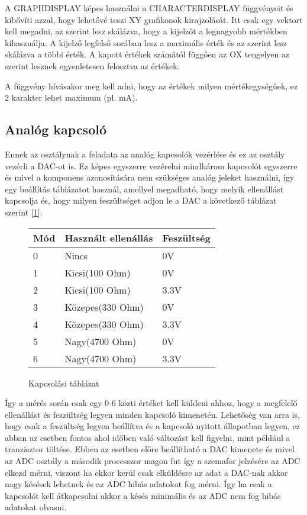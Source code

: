 A GRAPHDISPLAY képes használni a CHARACTERDISPLAY függvényeit és kibővíti azzal,
hogy lehetővé teszi XY grafikonok kirajzolását. Itt csak egy vektort kell megadni,
az szerint lesz skálázva, hogy a kijelzőt a legnagyobb mértékben kihasználja.
A kijelző legfelső sorában lesz a maximális érték és az szerint lesz skálázva a
többi érték. A kapott értékek számától függően az OX tengelyen az szerint lesznek
egyenletesen felosztva az értékek.

A függvény hívásakor meg kell adni, hogy az értékek milyen mértékegységűek, ez 2
karakter lehet maximum (pl. mA). 



\subsection{Analóg kapcsoló}

Ennek az osztálynak a feladata az analóg kapcsolók vezérlése és ez az
osztály vezérli a DAC-ot is. Ez képes egyszerre vezérelni mindhárom kapcsolót
egyszerre és mivel a komponens azonosítására nem szükséges analóg jeleket
használni, így egy beállítás táblázatot használ, amellyel megadható, hogy 
melyik ellenállást kapcsolja és, hogy milyen feszültséget adjon le a DAC
a következő táblázat szerint [\ref{fig:KapcsoloMod}].

\begin{figure}[H]
    \centering
    \begin{tabular}{|l|l|l|}
    \hline
    Mód & Használt ellenállás & Feszültség \\ \hline
    0   & Nincs               & 0V         \\ \hline
    1   & Kicsi(100 Ohm)      & 0V         \\ \hline
    2   & Kicsi(100 Ohm)      & 3.3V       \\ \hline
    3   & Közepes(330 Ohm)    & 0V         \\ \hline
    4   & Közepes(330 Ohm)    & 3.3V       \\ \hline
    5   & Nagy(4700 Ohm)      & 0V         \\ \hline
    6   & Nagy(4700 Ohm)      & 3.3V       \\ \hline
\end{tabular}
\caption{Kapcsolási táblázat}
\label{fig:KapcsoloMod}
\end{figure}

Így a mérés során csak egy 0-6 közti értéket kell küldeni 
ahhoz, hogy a megfelelő ellenállást és feszültség legyen
minden kapcsoló kimenetén. Lehetőség van arra is, hogy csak 
a feszültség legyen beállítva és a kapcsoló nyitott állapotban legyen,
ez abban az esetben fontos ahol időben való változást kell figyelni,
mint például a tranzisztor töltése. Ebben az esetben előre 
beállítható a DAC kimenete és mivel az ADC osztály a második
processzor magon fut így a szemafor jelzésére az ADC elkezd mérni, 
viszont ha ekkor kerül csak elküldésre az adat a DAC-nak akkor 
nagy késések lehetnek és az ADC hibás adatokat fog mérni.
Így ha csak a kapcsolót kell átkapcsolni akkor a késés minimális és az ADC
nem fog hibás adatokat olvasni.

